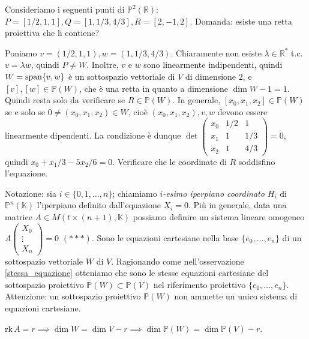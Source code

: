 \begin{exc}
  Consideriamo i seguenti punti di $\mathbb{P}^2(\mathbb{R})$: $P=[1/2,1,1], Q=[1,1/3,4/3],R=[2,-1,2]$. Domanda: esiste una retta proiettiva che li contiene?
\end{exc}

\begin{sol}
  Poniamo $v=(1/2,1,1), w=(1,1/3,4/3)$. Chiaramente non esiste $\lambda \in \mathbb{R}^*$ t.c. $v=\lambda w$, quindi $P \not=W$. Inoltre, $v$ e $w$ sono linearmente indipendenti, quindi $W=\operatorname{span}\{v,w\}$ è un sottospazio vettoriale di $V$ di dimensione $2$, e $[v], [w] \in \mathbb{P}(W)$, che è una retta in quanto a dimensione $\dim{W}-1=1$.
  Quindi resta solo da verificare se $R \in \mathbb{P}(W)$. In generale, $[x_0, x_1, x_2] \in \mathbb{P}(W)$ se e solo se $0\not=(x_0,x_1,x_2) \in W$, cioè $(x_0,x_1,x_2), v, w$ devono essere linearmente dipendenti. La condizione è dunque $\det{\begin{pmatrix}
    x_0 & 1/2 & 1 \\ x_1 & 1 & 1/3 \\ x_2 & 1 & 4/3
\end{pmatrix}}=0$, quindi $x_0+x_1/3-5x_2/6=0$. Verificare che le coordinate di $R$ soddisfino l'equazione.
\end{sol}

Notazione: sia $i \in \{0, 1, \dots, n\}$; chiamiamo \textit{$i$-esimo iperpiano coordinato $H_i$} di $\mathbb{P}^n(\mathbb{K})$ l'iperpiano definito dall'equazione $X_i=0$.
Più in generale, data una matrice $A \in M(t \times (n+1), \mathbb{K})$ possiamo definire un sistema lineare omogeneo $A \begin{pmatrix}
  X_0 \\ \vdots \\ X_n
\end{pmatrix}=0$ $(***)$. Sono le equazioni cartesiane nella base $\{e_0, \dots, e_n\}$ di un sottospazio vettoriale $W$ di $V$. Ragionando come nell'osservazione \ref{stessa_equazione} otteniamo che sono le stesse equazioni cartesiane del sottospazio proiettivo $\mathbb{P}(W) \subset \mathbb{P}(V)$ nel riferimento proiettivo $\{e_0, \dots, e_n\}$. \\

Attenzione: un sottospazio proiettivo $\mathbb{P}(W)$ non ammette un unico sistema di equazioni cartesiane. \marginpar\warningsign

\begin{oss}
  $\text{rk}\,A=r \implies \dim{W}=\dim{V}-r \implies \dim{\mathbb{P}(W)}=\dim{\mathbb{P}(V)}-r$.
\end{oss}

